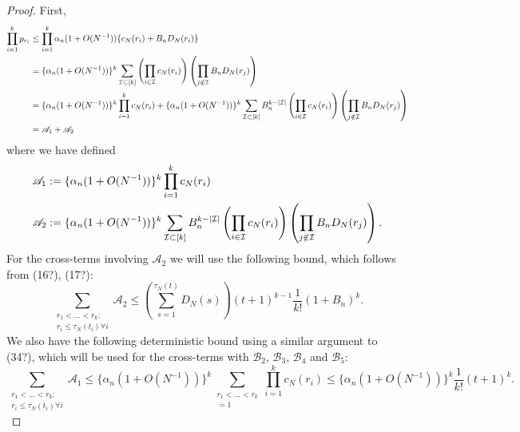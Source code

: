 \documentclass{article}
\newcommand{\1}[1]{\mathbbm{1}_{#1}}
\begin{document}
\begin{proof}
First,
\begin{align}
\prod_{i=1}^k p_{r_i} 
&\leq \prod_{i=1}^k \alpha_n (1+O(N^{-1})) \{ c_N(r_i) + B_n D_N(r_i) \} \notag\\
&= \{ \alpha_n (1+O(N^{-1})) \}^k \sum_{\mathcal{I} \subseteq [k]}
\left( \prod_{i \in \mathcal{I}} c_N(r_i) \right)
\left( \prod_{j \notin \mathcal{I}} B_n D_N(r_j) \right) \notag\\
&= \{ \alpha_n (1+O(N^{-1})) \}^k \prod_{i=1}^k  c_N(r_i)
+ \{ \alpha_n (1+O(N^{-1})) \}^k \sum_{\mathcal{I} \subset [k]} B_n^{k - |\mathcal{I}|}
\left( \prod_{i \in \mathcal{I}} c_N(r_i) \right)
\left( \prod_{j \notin \mathcal{I}} B_n D_N(r_j) \right) \notag\\
& = \mathscr{A}_1 + \mathscr{A}_2
\end{align}
where we have defined
\begin{align}
&\mathscr{A}_1 := \{ \alpha_n (1+O(N^{-1})) \}^k \prod_{i=1}^k  c_N(r_i) \notag\\
&\mathscr{A}_2 := \{ \alpha_n (1+O(N^{-1})) \}^k \sum_{\mathcal{I} \subset [k]} B_n^{k - |\mathcal{I}|}
\left( \prod_{i \in \mathcal{I}} c_N(r_i) \right)
\left( \prod_{j \notin \mathcal{I}} B_n D_N(r_j) \right) .
\end{align}
For the cross-terms involving $\mathscr{A}_2$ we will use the following bound, which follows from (16?), (17?):
\begin{equation}
\sum_{\substack{r_1 <\dots< r_k :\\ r_i \leq \tau_N(t_i) \forall i}} \mathscr{A}_2 
\leq \left( \sum_{s=1}^{\tau_N(t)} D_N(s) \right) (t+1)^{k-1} \frac{1}{k!} (1+B_n)^k .
\end{equation}
We also have the following deterministic bound using a similar argument to (34?), which will be used for the cross-terms with $\mathscr{B}_2$, $\mathscr{B}_3$, $\mathscr{B}_4$ and $\mathscr{B}_5$:
\begin{equation}
\sum_{\substack{r_1 <\dots< r_k :\\ r_i \leq \tau_N(t_i) \forall i}} \mathscr{A}_1
\leq \{ \alpha_n (1+O(N^{-1})) \}^k \sum_{\substack{r_1 <\dots< r_k \\ =1}} \prod_{i=1}^k c_N(r_i) 
\leq \{ \alpha_n (1+O(N^{-1})) \}^k \frac{1}{k!} (t+1)^k .
\end{equation}


\end{proof}
\end{document}
